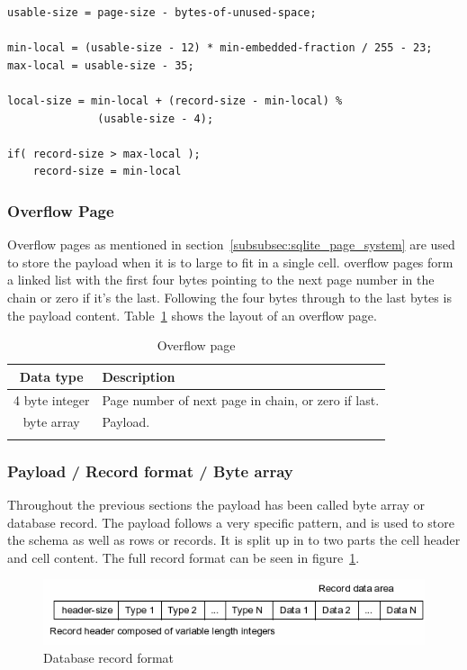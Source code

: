 \begin{lstlisting}	
usable-size = page-size - bytes-of-unused-space;

min-local = (usable-size - 12) * min-embedded-fraction / 255 - 23;
max-local = usable-size - 35;

local-size = min-local + (record-size - min-local) %
			  (usable-size - 4);

if( record-size > max-local );
	record-size = min-local
\end{lstlisting}


\subsubsection{Overflow Page}
\label{subsubsec:overflow_page}

Overflow pages as mentioned in section~\ref{subsubsec:sqlite_page_system} are used to store the payload when it is to large to fit in a single cell. overflow pages form a linked list with the first four bytes pointing to the next page number in the chain or zero if it's the last. Following the four bytes through to the last bytes is the payload content. Table~\ref{tbl:overflow_page} shows the layout of an overflow page.

\begin{longtable}[h]{| c | p{5cm} |}
		\hline
			\textbf{Data type} & \textbf{Description} \\ 
		\hline
		\endhead
			4 byte integer & Page number of next page in chain, or zero if last. \\
		\hline
			byte array & Payload. \\
		\hline
	\caption{Overflow page}
	\label{tbl:overflow_page}
\end{longtable}

\subsubsection{Payload / Record format / Byte array}
\label{subsubsec:record_format}

Throughout the previous sections the payload has been called byte array or database record. The payload follows a very specific pattern, and is used to store the schema as well as rows or records. It is split up in to two parts the cell header and cell content. The full record format can be seen in figure~\ref{fig:sqlite_record_format}.

\begin{figure}[H]
	\centering
	\includegraphics[scale=0.7]{images/recordformat.png}
	\caption{Database record format \citep{sqliteray}}
	\label{fig:sqlite_record_format}
\end{figure}

